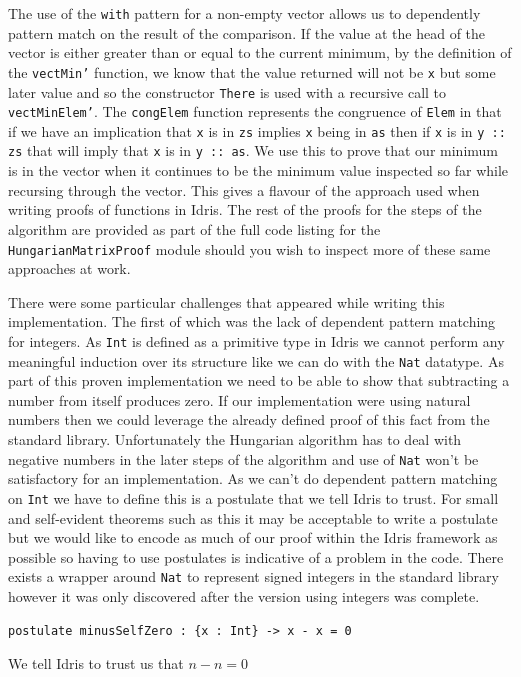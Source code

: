 \documentclass[a4paper, notitlepage]{report}
\begin{document}
The use of the \texttt{with} pattern for a non-empty vector allows us to dependently
pattern match on the result of the comparison. If the value at the head of the
vector is either greater than or equal to the current minimum, by the definition
of the \texttt{vectMin'} function, we know that the value returned will not be \texttt{x} but some
later value and so the constructor \texttt{There} is used with a recursive call to
\texttt{vectMinElem'}. The \texttt{congElem} function represents the congruence of \texttt{Elem} in that if
we have an implication that \texttt{x} is in \texttt{zs} implies \texttt{x} being in \texttt{as} then if \texttt{x} is in \texttt{y
:: zs} that will imply that \texttt{x} is in \texttt{y :: as}. We use this to prove that our
minimum is in the vector when it continues to be the minimum value inspected so
far while recursing through the vector. This gives a flavour of the approach
used when writing proofs of functions in Idris. The rest of the proofs for the
steps of the algorithm are provided as part of the full code listing for the
\texttt{HungarianMatrixProof} module should you wish to inspect more of these same
approaches at work.

There were some particular challenges that appeared while writing this
implementation. The first of which was the lack of dependent pattern matching
for integers. As \texttt{Int} is defined as a primitive type in Idris we cannot perform
any meaningful induction over its structure like we can do with the \texttt{Nat}
datatype. As part of this proven implementation we need to be able to show that
subtracting a number from itself produces zero. If our implementation were using
natural numbers then we could leverage the already defined proof of this fact
from the standard library. Unfortunately the Hungarian algorithm has to deal
with negative numbers in the later steps of the algorithm and use of \texttt{Nat} won't
be satisfactory for an implementation. As we can't do dependent pattern matching
on \texttt{Int} we have to define this is a postulate that we tell Idris to trust. For
small and self-evident theorems such as this it may be acceptable to write a
postulate but we would like to encode as much of our proof within the Idris
framework as possible so having to use postulates is indicative of a problem in
the code. There exists a wrapper around \texttt{Nat} to represent signed integers in the
standard library however it was only discovered after the version using integers
was complete.

\begin{listing}[H]
\begin{verbatim}
postulate minusSelfZero : {x : Int} -> x - x = 0
\end{verbatim}
\caption{We tell Idris to trust us that \(n\mathbin{-} n \mathrel{=} 0\)}
\end{listing}
\end{document}
